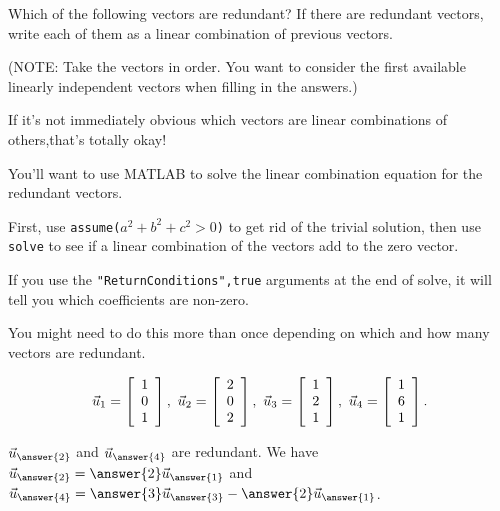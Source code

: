 \documentclass{ximera}
\author{Zack Reed}
\begin{document}
\begin{exercise}

    Which of the following vectors are redundant? If there are redundant
vectors, write each of them as a linear combination of previous
vectors.

(NOTE: Take the vectors in order. You want to consider the first available linearly independent vectors when filling in the answers.)

\begin{hint}

    If it's not immediately obvious which vectors are linear combinations of others,that's totally okay! 
    
    You'll want to use MATLAB to solve the linear combination equation for the redundant vectors.

    First, use \texttt{assume($a^2+b^2+c^2>0$)} to get rid of the trivial solution, then use \texttt{solve} to see if a linear combination of the vectors add to the zero vector.

    If you use the \texttt{"ReturnConditions",true} arguments at the end of solve, it will tell you which coefficients are non-zero. 

    You might need to do this more than once depending on which and how many vectors are redundant.

\end{hint}
\begin{equation*}
  \vect{u}_1 = \startmat{r} 1 \\ 0 \\ 1 \stopmat,\quad
  \vect{u}_2 = \startmat{r} 2 \\ 0 \\ 2 \stopmat,\quad
  \vect{u}_3 = \startmat{r} 1 \\ 2 \\ 1 \stopmat,\quad
  \vect{u}_4 = \startmat{r} 1 \\ 6 \\ 1 \stopmat.
\end{equation*}

  $\vect{u}_{\answer{2}}$ and $\vect{u}_{\answer{4}}$ are redundant. We have
  $\vect{u}_{\answer{2}}=\answer{2}\vect{u}_{\answer{1}}$ and $\vect{u}_{\answer{4}}=\answer{3}\vect{u}_{\answer{3}}-\answer{2}\vect{u}_{\answer{1}}$.


\end{exercise}
\end{document}
